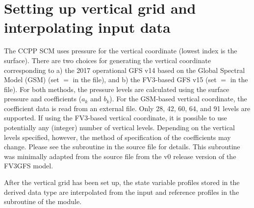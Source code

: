 \section{Setting up vertical grid and interpolating input data}
The CCPP SCM uses pressure for the vertical coordinate (lowest index is the surface). There are two choices for generating the vertical coordinate corresponding to a) the 2017 operational GFS v14 based on the Global Spectral Model (GSM) (set  $=$  in the  file), and b) the FV3-based GFS v15 (set  $=$  in the  file). For both methods, the pressure levels are calculated using the surface pressure and coefficients ($a_k$ and $b_k$). For the GSM-based vertical coordinate, the coefficient data is read from an external file. Only 28, 42, 60, 64, and 91 levels are supported. If using the FV3-based vertical coordinate, it is possible to use potentially any (integer) number of vertical levels. Depending on the vertical levels specified, however, the method of specification of the coefficients may change. Please see the subroutine  in the source file  for details. This subroutine was minimally adapted from the source file  from the v0 release version of the FV3GFS model.

After the vertical grid has been set up, the state variable profiles stored in the  derived data type are interpolated from the input and reference profiles in the  subroutine of the  module.

